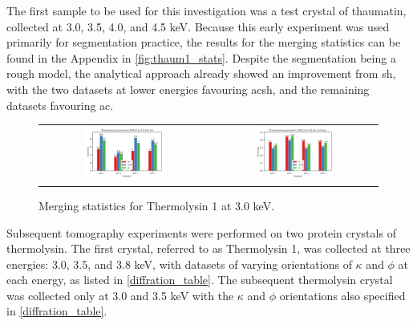 The first sample to be used for this investigation was a test crystal of thaumatin, collected at 3.0, 3.5, 4.0, and 4.5 \unit{keV}. Because this early experiment was used primarily for segmentation practice, the results for the merging statistics can be found in the Appendix in \cref{fig:thaum1_stats}. Despite the segmentation being a rough model, the analytical approach already showed an improvement from \ac{sh}, with the two datasets at lower energies favouring \ac{acsh}, and the remaining datasets favouring \ac{ac}.

\begin{figure}[h]
    \centering
    \begin{tabular}{cc}
    \includegraphics[width = 0.5\textwidth]{plots/exp1/tlys_9_P6122/3p0_I_over_sigma.png} & \includegraphics[width = 0.5\textwidth]{plots/exp1/tlys_9_P6122/3p0_rmerges.png}
    \end{tabular}
    \caption{Merging statistics for Thermolysin 1 at 3.0 \unit{keV}.}
    \label{fig:tlys_9_3p0}
\end{figure}

Subsequent tomography experiments were performed on two protein crystals of thermolysin. The first crystal, referred to as Thermolysin 1, was collected at three energies: 3.0, 3.5, and 3.8 \unit{keV}, with datasets of varying orientations of $\kappa$ and $\phi$ at each energy, as listed in \cref{diffration_table}. The subsequent thermolysin crystal was collected only at 3.0 and 3.5 \unit{keV} with the $\kappa$ and $\phi$ orientations also specified in \cref{diffration_table}.

